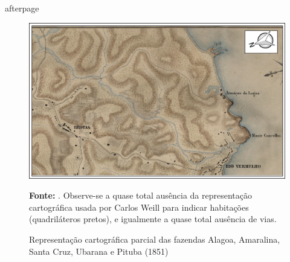 afterpage{
\begin{a3paisagem}
\begin{figure}[!htp]
\caption{Representação cartográfica parcial das fazendas Alagoa, Amaralina, Santa Cruz, Ubarana e Pituba (1851)}
\centering
\includegraphics[width=\textwidth]{3-cap2/complementos/mapas/georreferenciamento/amaralina/armacaodalagoa-1851-pronto.jpg}{\footnotesize \par \textbf{Fonte:} . Observe-se a quase total ausência da representação cartográfica usada por Carlos Weill para indicar habitações (quadriláteros pretos), e igualmente a quase total ausência de vias. \par}
\label{fig:amaralina1851}
\end{figure}
\end{a3paisagem}
}

